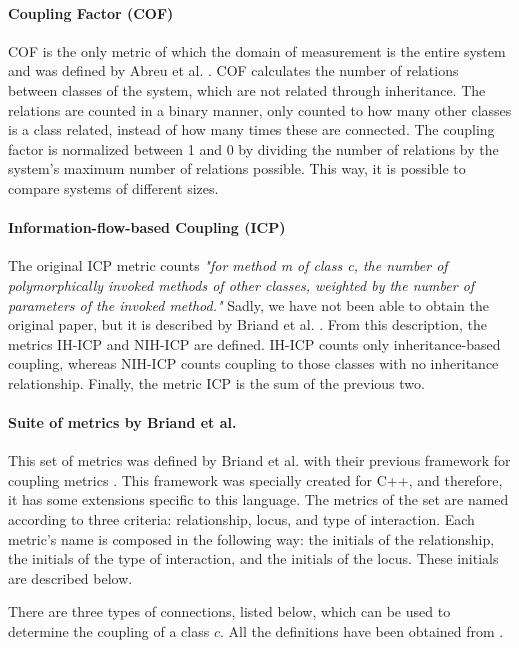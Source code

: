 \paragraph{Coupling Factor (COF)} COF is the only metric of which the domain of measurement is the entire system and was defined by Abreu et al. \cite{abreu1995toward}. COF calculates the number of relations between classes of the system, which are not related through inheritance. The relations are counted in a binary manner, only counted to how many other classes is a class related, instead of how many times these are connected. The coupling factor is normalized between 1 and 0 by dividing the number of relations by the system's maximum number of relations possible. This way, it is possible to compare systems of different sizes.

\paragraph{Information-flow-based Coupling (ICP)} The original ICP metric counts \textit{"for method m of class c, the number of polymorphically invoked methods of other classes, weighted by the number of parameters of the invoked method."} Sadly, we have not been able to obtain the original paper, but it is described by Briand et al. \cite{briand1999unified}. From this description, the metrics IH-ICP and NIH-ICP are defined. IH-ICP counts only inheritance-based coupling, whereas NIH-ICP counts coupling to those classes with no inheritance relationship. Finally, the metric ICP is the sum of the previous two.

\paragraph{Suite of metrics by Briand et al.} This set of metrics was defined by Briand et al. with their previous framework for coupling metrics \cite{briand1997investigation}. This framework was specially created for C++, and therefore, it has some extensions specific to this language.
The metrics of the set are named according to three criteria: relationship, locus, and type of interaction. Each metric's name is composed in the following way: the initials of the relationship, the initials of the type of interaction, and the initials of the locus. These initials are described below.

\blankl
There are three types of connections, listed below, which can be used to determine the coupling of a class $c$. All the definitions have been obtained from \cite{briand1997investigation}.

